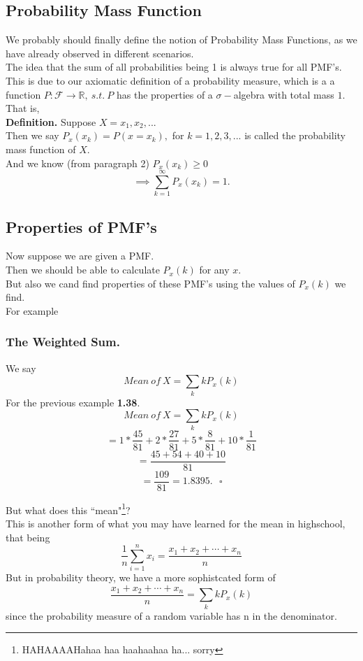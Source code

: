 \documentclass[12pt]{book}
\begin{document}
\subsection{Probability Mass Function}
We probably should finally define the notion of Probability Mass Functions, as we have already observed in different scenarios. \\

\noindent The idea that the sum of all probabilities being 1 is always true for all PMF's. 
This is due to our axiomatic definition of a probability measure, which is a a function $P:\mathcal{F} \to \mathbb{R},~s.t.~P$ has the properties of a $\sigma-$algebra with total mass $1$.\\

\noindent That is, \\
\textbf{Definition. } Suppose $X=x_{1},x_{2}, ...$\\
Then we say $P_{x}(x_{k})=P(x=x_{k}),$ for $k=1,2,3,...$ is called the probability mass function of $X$.\\
And we know (from paragraph 2) $P_{x}(x_{k})\geq 0$
$$\implies{} \sum\limits_{k=1}^{\infty} P_{x} (x_{k})=1.$$


\subsection{Properties of PMF's}
Now suppose we are given a PMF.\\
Then we should be able to calculate $P_{x}(k)$ for any $x$.\\
But also we cand find properties of these PMF's using the values of $P_{x}(k)$ we find.\\
For example

\subsubsection{The Weighted Sum. }
We say
$$Mean~of~X=\sum\limits_{k} kP_{x}(k)$$
\noindent For the previous example \textbf{1.38}.
$$Mean~of~X=\sum\limits_{k} kP_{x}(k)$$
$$= 1* \frac{45}{81} + 2* \frac{27}{81} + 5* \frac{8}{81} + 10* \frac{1}{81}$$
$$= \frac{45+54+40+10}{81}$$
$$=\frac{109}{81}=1.8395.~~~\square$$


\noindent But what does this ``mean"\footnote{HAHAAAAHahaa haa haahaahaa ha... sorry}?\\

\noindent This is another form of what you may have learned for the mean in highschool, that being 
$$\frac{1}{n}\sum\limits_{i=1}^{n} x_{i}= \frac{x_{1}+x_{2}+\cdots+x_{n}}{n}$$
But in probability theory, we have a more sophistcated form of 
$$\frac{x_{1}+x_{2}+\cdots+x_{n}}{n}=\sum\limits_{k} kP_{x}(k)$$
since the probability measure of a random variable has n in the denominator. \\
\end{document}
